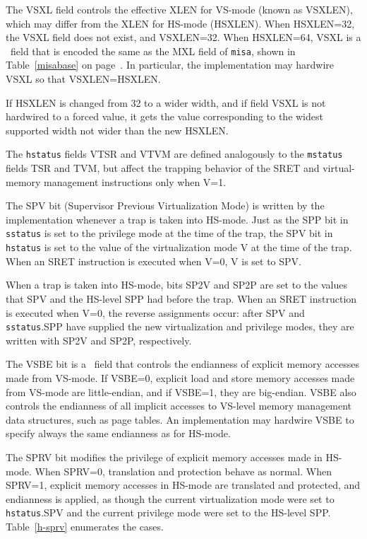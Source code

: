 The VSXL field controls the effective XLEN for VS-mode (known as VSXLEN),
which may differ from the XLEN for HS-mode (HSXLEN).
When HSXLEN=32, the VSXL field does not exist, and VSXLEN=32.
When HSXLEN=64, VSXL is a \warl\ field that is encoded the same as the
MXL field of {\tt misa}, shown in Table~\ref{misabase} on
page~\pageref{misabase}.
In particular, the implementation may hardwire VSXL so that VSXLEN=HSXLEN.

If HSXLEN is changed from 32 to a wider width, and if field VSXL is not
hardwired to a forced value, it gets the value corresponding to the
widest supported width not wider than the new HSXLEN.

The {\tt hstatus} fields VTSR and VTVM are defined analogously to the
{\tt mstatus} fields TSR and TVM, but affect the trapping behavior of the SRET
and virtual-memory management instructions only when V=1.

The SPV bit (Supervisor Previous Virtualization Mode) is written by the implementation
whenever a trap is taken into HS-mode.  Just as the SPP bit in {\tt sstatus} is set to the privilege
mode at the time of the trap, the SPV bit in {\tt hstatus} is set to the value of the virtualization
mode V at the time of the trap.  When an SRET instruction is executed when V=0,
V is set to SPV.

When a trap is taken into HS-mode, bits SP2V and SP2P are set to the values
that SPV and the HS-level SPP had before the trap.
When an SRET instruction is executed when V=0, the reverse assignments occur:
after SPV and {\tt sstatus}.SPP have supplied the new virtualization and
privilege modes, they are written with SP2V and SP2P, respectively.

The VSBE bit is a \warl\ field that controls the endianness of explicit
memory accesses made from VS-mode.
If VSBE=0, explicit load and store memory accesses made from VS-mode are
little-endian, and if VSBE=1, they are big-endian.
VSBE also controls the endianness of all implicit accesses to VS-level
memory management data structures, such as page tables.
An implementation may hardwire VSBE to specify always the same endianness
as for HS-mode.

The SPRV bit modifies the privilege of explicit memory accesses made in
HS-mode.
When SPRV=0, translation and protection behave as normal.
When SPRV=1, explicit memory accesses in HS-mode are translated and
protected, and endianness is applied, as though the current
virtualization mode were set to {\tt hstatus}.SPV and the current
privilege mode were set to the HS-level SPP.
Table~\ref{h-sprv} enumerates the cases.

